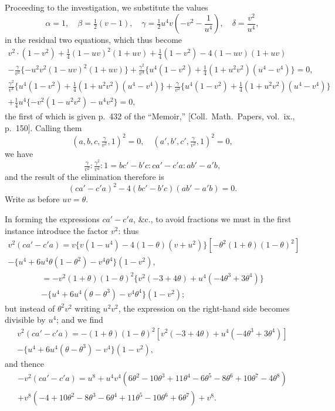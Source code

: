 \documentclass[11pt,a4paper]{book}
\providecommand{\between}{,}
\begin{document}
\newpage
Proceeding to the investigation, we substitute the values
\[
\alpha = 1,\quad \beta = \tfrac{1}{2}(v - 1),\quad \gamma = \tfrac{1}{2}u^4 v\left(-v^2 - \frac{1}{u^4}\right),\quad \delta = \frac{v^2}{u^4},
\]
in the residual two equations, which thus become
\begin{gather*}
v^2 \cdot (1 - v^2) + \tfrac{1}{4}(1 - uv)^2(1 + uv) + \tfrac{1}{4}(1 - v^2) - 4(1 - uv)(1 + uv) \\
- \frac{\gamma}{v^2}\{-u^2 v^2 (1 - uv)^2 (1 + uv)\} + \frac{\gamma^2}{v^4}\{u^4(1 - v^2) + \tfrac{1}{4}(1 + u^2 v^2)(u^4 - v^4)\} = 0,
\end{gather*}
\begin{gather*}
\frac{\gamma^2}{v^4}\{u^4(1 - v^2) + \tfrac{1}{4}(1 + u^2 v^2)(u^4 - v^4)\} + \frac{\gamma}{v^2}\{u^4(1 - v^2) + \tfrac{1}{4}(1 + u^2 v^2)(u^4 - v^4)\} \\
+ \frac{1}{4}u^4\{-v^2(1 - u^2 v^2) - u^4 v^2\} = 0,
\end{gather*}
the first of which is given p.~432 of the ``Memoir,'' [Coll.\ Math.\ Papers, vol.\ ix., p.~150]. Calling them
\[
(a, b, c \between \tfrac{\gamma}{v^2}, 1)^2 = 0,\quad (a', b', c' \between \tfrac{\gamma}{v^2}, 1)^2 = 0,
\]
we have
\[
\tfrac{\gamma}{v^2} : \tfrac{\gamma^2}{v^4} : 1 = bc' - b'c : ca' - c'a : ab' - a'b,
\]
and the result of the elimination therefore is
\[
(ca' - c'a)^2 - 4(bc' - b'c)(ab' - a'b) = 0.
\]
Write as before $uv = \theta$.

In forming the expressions $ca' - c'a$, \&c., to avoid fractions we must in the first instance introduce the factor $v^2$: thus
\begin{multline*}
v^2(ca' - c'a) = v\{v(1 - u^4) - 4(1 - \theta)(v + u^2)\}[-\theta^2(1 + \theta)(1 - \theta)^2]\\
- \{u^4 + 6u^4\theta(1 - \theta^2) - v^4\theta^4\}(1 - v^2),
\end{multline*}
\begin{multline*}
= -v^2(1 + \theta)(1 - \theta)^2\{v^2(-3 + 4\theta) + u^4(-4\theta^3 + 3\theta^4)\}\\
- \{u^4 + 6u^4(\theta - \theta^3) - v^4\theta^4\}(1 - v^2);
\end{multline*}
but instead of $\theta^2 v^2$ writing $u^2 v^2$, the expression on the right-hand side becomes divisible by $u^4$; and we find
\begin{multline*}
v^2(ca' - c'a) = -(1 + \theta)(1 - \theta)^2[v^2(-3 + 4\theta) + u^4(-4\theta^3 + 3\theta^4)]\\
- \{u^4 + 6u^4(\theta - \theta^3) - v^4\}(1 - v^2),
\end{multline*}
and thence
\begin{multline*}
-v^2(ca' - c'a) = u^8 + u^4 v^4(6\theta^2 - 10\theta^3 + 11\theta^4 - 6\theta^5 - 8\theta^6 + 10\theta^7 - 4\theta^8)\\
+ v^8(-4 + 10\theta^2 - 8\theta^3 - 6\theta^4 + 11\theta^5 - 10\theta^6 + 6\theta^7) + v^8.
\end{multline*}
\end{document}
